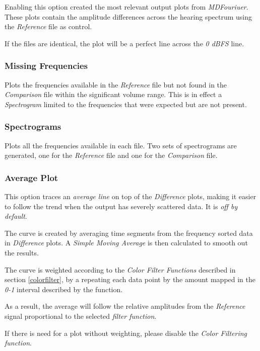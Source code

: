 \documentclass[10pt,a4paper]{report}
\begin{document}
Enabling this option created the most relevant output plots from \textit{MDFouriuer}. These plots contain the amplitude differences across the hearing spectrum using the \textit{Reference} file as control.

If the files are identical, the plot will be a perfect line across the \textit{0 dBFS} line.

\subsubsection{Missing Frequencies} 

Plots the frequencies available in the \textit{Reference} file but not found in the \textit{Comparison} file within the significant volume range. This is in effect a \textit{Spectrogram} limited to the frequencies that were expected but are not present.
	
\subsubsection{Spectrograms}

Plots all the frequencies available in each file. Two sets of spectrograms are generated, one for the \textit{Reference} file and one for the \textit{Comparison} file.

\subsubsection{Average Plot}
\label{averaged}

This option traces an \textit{average line} on top of the \textit{Difference} plots, making it easier to follow the trend when the output has severely scattered data. It is \textit{off by default}.
 
The curve is created by averaging time segments from the frequency sorted data in \textit{Difference} plots. A \textit{Simple Moving Average} is then calculated to smooth out the results.

The curve is weighted according to the \textit{Color Filter Functions} described in section \ref{colorfilter}, by a repeating each data point by the amount mapped in the \textit{0-1} interval described by the function.

As a result, the average will follow the relative amplitudes from the \textit{Reference} signal proportional to the selected \textit{filter function}.

If there is need for a plot without weighting, please disable the \textit{Color Filtering function}.
\end{document}
